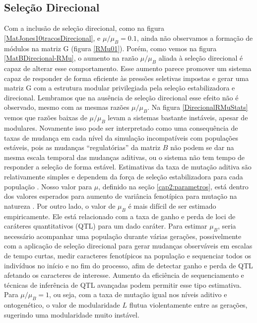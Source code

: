 \subsection{Seleção Direcional}
\label{cap3:DirecB}

Com a inclusão de seleção direcional, como na figura
\ref{MatJones10tracosDirecional}, e $\mu/\mu_B = 0.1$, ainda não
observamos a formação de módulos na matriz G (figura \ref{RMu01}). 
Porém, como vemos na figura \ref{MatBDirecional-RMu}, o aumento  na
razão $\mu/\mu_B$ aliada à seleção direcional é capaz de alterar esse
comportamento. 
Esse aumento parece promover um sistema capaz de responder de forma
eficiente às pressões seletivas impostas e gerar uma matriz G com a
estrutura modular privilegiada pela seleção estabilizadora e direcional. 
Lembramos que na ausência de seleção direcional esse efeito não é
observado, mesmo com as mesmas razões $\mu/\mu_B$. 
Na figura \ref{DirecionalRMuStats} vemos que razões baixas de $\mu/\mu_B$ levam
a sistemas bastante instáveis, apesar de modulares. 
Novamente isso pode ser interpretado como uma consequência de taxas de
mudança em cada nível da simulação incompatíveis com populações
estáveis, pois as mudanças ``regulatórias'' da matriz $B$ não podem se dar na mesma
escala temporal das mudanças aditivas, ou o sistema não tem tempo de
responder a seleção de forma estável. 
Estimativas da taxa de mutação aditiva são relativamente
simples e dependem da força de seleção estabilizadora para cada
população \citep{Lynch1998}.
Nosso valor para $\mu$, definido na seção \ref{cap2:parametros}, está
dentro dos valores esperados para aumento de variância fenotípica para
mutação na natureza \citep{Burger1994}.
Por outro lado, o valor de $\mu_B$ é mais difícil de ser estimado empiricamente.
Ele está relacionado com a taxa de ganho e perda de loci de caráteres
quantitativos (QTL) para um dado caráter.
Para estimar $\mu_B$, seria necessário acompanhar uma população durante
várias gerações, possivelmente com a aplicação de seleção direcional
para gerar mudanças observáveis em escalas de tempo curtas, medir
caracteres fenotípicos na população e sequenciar todos os indivíduos no
início e no fim do processo, afim de detectar ganho e perda de QTL
afetando os caracteres de interesse.
Aumento da eficiência de sequenciamento e técnicas de inferência de QTL
avançadas podem permitir esse tipo estimativa.
Para $\mu/\mu_B=1$, ou seja, com a taxa de mutação igual nos níveis
aditivo e ontogenético, o valor de modularidade $L$ flutua violentamente entre
as gerações, sugerindo uma modularidade muito instável. 
